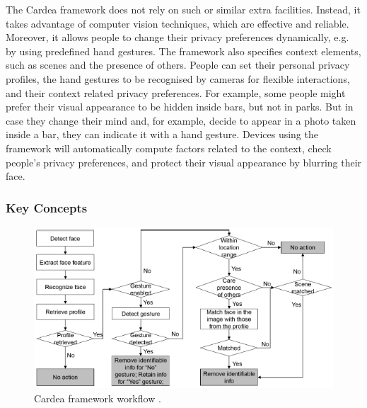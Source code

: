 \documentclass[conference]{IEEEtran}
\begin{document}
The Cardea framework \cite{shu2016cardea} does not rely on such or similar extra facilities. Instead, it takes advantage of computer vision techniques, which are effective and reliable. Moreover, it allows people to change their privacy preferences dynamically, e.g. by using predefined hand gestures. The framework also specifies context elements, such as scenes and the presence of others. People can set their personal privacy profiles, the hand gestures to be recognised by cameras for flexible interactions, and their context related privacy preferences. For example, some people might prefer their visual appearance to be hidden inside bars, but not in parks. But in case they change their mind and, for example, decide to appear in a photo taken inside a bar, they can indicate it with a hand gesture. Devices using the framework will automatically compute factors related to the context, check people's privacy preferences, and protect their visual appearance by blurring their face.

\subsubsection{Key Concepts}
\begin{figure}[t]
\centerline{\includegraphics[width=.5\textwidth]{img/cardea_workflow.png}}
\caption{Cardea framework workflow \cite{shu2016cardea}.}
\label{fig:cardea}
\end{figure}
\end{document}
